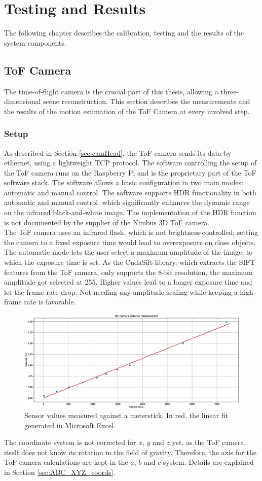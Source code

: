 \chapter{Testing and Results}
\label{sec:Results}
The following chapter describes the calibration, testing and the results of the system components. 
\section{ToF Camera}
The time-of-flight camera is the crucial part of this thesis, allowing a three-dimensional scene reconstruction. This section describes the measurements and the results of the motion estimation of the ToF Camera at every involved step.
\subsection{Setup}
As described in Section \ref{sec:camHead}, the ToF camera sends its data by ethernet, using a lightweight TCP protocol. The software controlling the setup of the ToF camera runs on the Raspberry Pi and is the proprietary part of the ToF software stack. The software allows a basic configuration in two main modes: automatic and manual control. The software supports HDR functionality in both automatic and manual control, which significantly enhances the dynamic range on the infrared black-and-white image. The implementation of the HDR function is not documented by the supplier of the Nimbus 3D ToF camera.\\ 
The ToF camera uses an infrared flash, which is not brightness-controlled; setting the camera to a fixed exposure time would lead to overexposure on close objects. The automatic mode lets the user select a maximum amplitude of the image, to which the exposure time is set. As the CudaSift library, which extracts the SIFT features from the ToF camera, only supports the 8-bit resolution, the maximum amplitude got selected at 255. Higher values lead to a longer exposure time and let the frame rate drop. Not needing any amplitude scaling while keeping a high frame rate is favorable. 
\begin{figure}[H]
    \centering
    \includegraphics[width=1.0\textwidth]{images/camera_distance_measurement.eps}
    \caption{Sensor values measured against a meterstick. In red, the linear fit generated in Microsoft Excel.}
    \label{im:distance_measurement}
\end{figure}
The coordinate system is not corrected for $x$, $y$ and $z$ yet, as the ToF camera itself does not know its rotation in the field of gravity. Therefore, the axis for the ToF camera calculations are kept in the $a$, $b$ and $c$ system. Details are explained in Section \ref{sec:ABC_XYZ_coords}.
